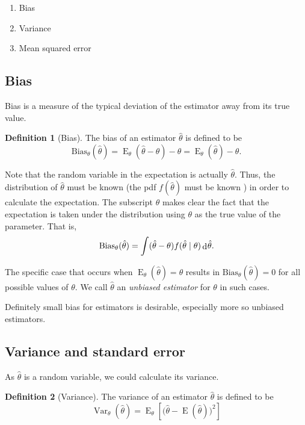 \documentclass[
]{book}
\providecommand{\tightlist}{%
  \setlength{\itemsep}{0pt}\setlength{\parskip}{0pt}}
\DeclareMathOperator{\E}{E}
\DeclareMathOperator{\Var}{Var}
\DeclareMathOperator{\dd}{d}
\newcommand{\dint}{\dd\hspace{0.5pt}\!}
\theoremstyle{definition}
\newtheorem{definition}{Definition}[chapter]
\theoremstyle{definition}
\theoremstyle{definition}
\theoremstyle{definition}
\theoremstyle{remark}
\begin{document}
\begin{enumerate}
\def\labelenumi{\arabic{enumi}.}
\tightlist
\item
  Bias
\item
  Variance
\item
  Mean squared error
\end{enumerate}

\hypertarget{bias}{%
\subsection{Bias}\label{bias}}

Bias is a measure of the typical deviation of the estimator away from its true value.

\begin{definition}[Bias]
The bias of an estimator \(\hat\theta\) is defined to be
\[\text{Bias}_\theta(\hat\theta) = {\E}_\theta(\hat\theta-\theta) - \theta = {\E}_\theta(\hat\theta) - \theta.\]
\end{definition}

Note that the random variable in the expectation is actually \(\hat\theta\).
Thus, the distribution of \(\hat\theta\) must be known (the pdf \(f(\hat\theta)\) must be known ) in order to calculate the expectation.
The subscript \(\theta\) makes clear the fact that the expectation is taken under the distribution using \(\theta\) as the true value of the parameter.
That is,
\[
\text{Bias}_\theta(\hat\theta) = \int (\hat\theta-\theta) f(\hat\theta\mid\theta) \dint \hat\theta.
\]

The specific case that occurs when \(\E_\theta(\hat\theta) = \theta\) results in \(\text{Bias}_\theta(\hat\theta)=0\) for all possible values of \(\theta\).
We call \(\hat\theta\) an \emph{unbiased estimator} for \(\theta\) in such cases.

Definitely small bias for estimators is desirable, especially more so unbiased estimators.

\hypertarget{variance-and-standard-error}{%
\subsection{Variance and standard error}\label{variance-and-standard-error}}

As \(\hat\theta\) is a random variable, we could calculate its variance.

\begin{definition}[Variance]
The variance of an estimator \(\hat\theta\) is defined to be
\[{\Var}_{\theta}(\hat\theta)=\E_\theta\left[\big(\hat\theta - \E(\hat\theta)\big)^2\right]\]
\end{definition}
\end{document}

